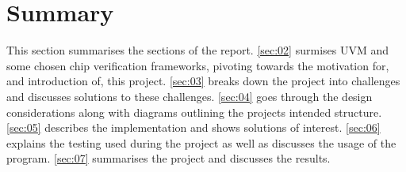 \section{Summary}\label{sec:01}
This section summarises the sections of the report.\newline
\cref{sec:02} surmises UVM and some chosen chip verification frameworks, pivoting towards the motivation for, and introduction of, this project.\newline
\cref{sec:03} breaks down the project into challenges and discusses solutions to these challenges.\newline
\cref{sec:04} goes through the design considerations along with diagrams outlining the projects intended structure.\newline
\cref{sec:05} describes the implementation and shows solutions of interest.\newline
\cref{sec:06} explains the testing used during the project as well as discusses the usage of the program.\newline
\cref{sec:07} summarises the project and discusses the results.\newline